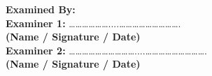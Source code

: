 \textbf{Examined By:}\\[0.3cm]
\hspace{1cm} \textbf{Examiner 1:} \hspace{0.2cm} ………………....……………………….\\
\hspace{6cm} \textbf{(Name / Signature / Date)}\\[0.8cm]

\hspace{1cm} \textbf{Examiner 2:} \hspace{0.2cm} …………………………....……………………….\\
\hspace{6cm} \textbf{(Name / Signature / Date)}
